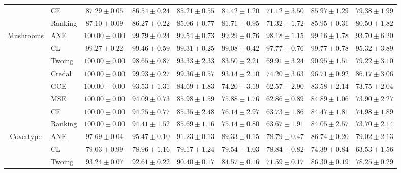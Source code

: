 \documentclass[letterpaper]{article} %
\begin{document}
\begin{table}[t]
\begin{tabular}{clccccccc}
 & CE     & $\mathbf{87.29 \pm 0.05}$ & $86.54 \pm 0.24$ & $85.21 \pm 0.55$ & $81.42 \pm 1.20$ & $71.12 \pm 3.50$ & $85.97 \pm 1.29$ & $79.38 \pm 1.99$ \\
 & Ranking & $87.10 \pm 0.09$ & $86.27 \pm 0.22$ & $85.06 \pm 0.77$ & $81.71 \pm 0.95$ & $71.32 \pm 1.72$ & $85.95 \pm 0.31$ & $80.50 \pm 1.82$ \\
\hline
\multirow{8}{*}{Mushrooms}
 & ANE    & $\mathbf{100.00 \pm 0.00}$ & $\mathbf{99.79 \pm 0.24}$ & $\mathbf{99.54 \pm 0.73}$ & $\mathbf{99.29 \pm 0.76}$ & $\mathbf{98.18 \pm 1.15}$ & $\mathbf{99.16 \pm 1.78}$ & $\mathbf{93.70 \pm 6.20}$ \\
 & CL     & $99.27 \pm 0.22$ & $\mathbf{99.46 \pm 0.59}$ & $\mathbf{99.31 \pm 0.25}$ & $\mathbf{99.08 \pm 0.42}$ & $\mathbf{97.77 \pm 0.76}$ & $\mathbf{99.77 \pm 0.78}$ & $\mathbf{95.32 \pm 3.89}$ \\
 & Twoing & $\mathbf{100.00 \pm 0.00}$ & $98.65 \pm 0.87$ & $93.33 \pm 2.33$ & $83.50 \pm 2.21$ & $69.91 \pm 3.24$ & $90.95 \pm 1.51$ & $79.22 \pm 3.10$ \\
 & Credal & $\mathbf{100.00 \pm 0.00}$ & $\mathbf{99.93 \pm 0.27}$ & $\mathbf{99.36 \pm 0.57}$ & $93.14 \pm 2.10$ & $74.20 \pm 3.63$ & $96.71 \pm 0.92$ & $86.17 \pm 3.06$ \\
 & GCE    & $\mathbf{100.00 \pm 0.00}$ & $93.53 \pm 1.31$ & $84.69 \pm 1.83$ & $74.20 \pm 3.19$ & $62.57 \pm 2.90$ & $83.58 \pm 2.14$ & $73.75 \pm 2.04$ \\
 & MSE    & $\mathbf{100.00 \pm 0.00}$ & $94.09 \pm 0.73$ & $85.98 \pm 1.59$ & $75.88 \pm 1.76$ & $62.86 \pm 0.89$ & $84.89 \pm 1.06$ & $73.90 \pm 2.27$ \\
 & CE     & $\mathbf{100.00 \pm 0.00}$ & $94.25 \pm 0.77$ & $85.35 \pm 2.48$ & $76.14 \pm 2.97$ & $63.73 \pm 1.86$ & $84.47 \pm 1.81$ & $74.98 \pm 1.89$ \\
 & Ranking & $\mathbf{100.00 \pm 0.00}$ & $94.41 \pm 1.52$ & $85.69 \pm 1.16$ & $75.14 \pm 0.80$ & $63.67 \pm 1.91$ & $84.05 \pm 2.57$ & $73.70 \pm 2.14$ \\
\hline
\multirow{8}{*}{Covertype}
 & ANE    & $97.69 \pm 0.04$ & $95.47 \pm 0.10$ & $91.23 \pm 0.13$ & $\mathbf{89.33 \pm 0.15}$ & $\mathbf{78.79 \pm 0.47}$ & $86.74 \pm 0.20$ & $\mathbf{79.02 \pm 2.13}$ \\
 & CL     & $79.03 \pm 0.99$ & $78.96 \pm 1.16$ & $79.17 \pm 1.24$ & $79.54 \pm 1.03$ & $\mathbf{78.84 \pm 0.82}$ & $74.39 \pm 0.84$ & $63.53 \pm 1.56$ \\
 & Twoing & $93.24 \pm 0.07$ & $92.61 \pm 0.22$ & $90.40 \pm 0.17$ & $84.57 \pm 0.16$ & $71.59 \pm 0.17$ & $86.30 \pm 0.19$ & $\mathbf{78.25 \pm 0.29}$ \\

\end{tabular}
\end{table}
\end{document}
